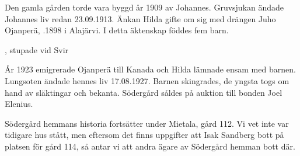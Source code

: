 Den gamla gården torde vara byggd år 1909 av Johannes. Gruvsjukan ändade Johannes liv redan 23.09.1913. Änkan Hilda gifte om sig med drängen Juho Ojanperä, .1898 i Alajärvi. I detta äktenskap föddes fem barn.
\begin{jhchildren}
  \item {}
  \item {}
  \item {}
  \item {}, stupade vid Svir
  \item {}
\end{jhchildren}

År 1923 emigrerade Ojanperä till Kanada och Hilda lämnade ensam med barnen. Lungsoten ändade hennes liv 17.08.1927. Barnen skingrades, de yngsta togs om hand av släktingar och bekanta. Södergård såldes på auktion till bonden Joel Elenius.

Södergård hemmans historia fortsätter under Mietala, gård 112. Vi vet inte var tidigare hus stått, men eftersom det finns uppgifter att Isak Sandberg bott på platsen för gård 114, så antar vi att andra ägare av Södergård hemman bott där.
